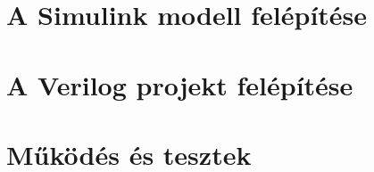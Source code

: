 \documentclass[11pt,a4paper,oneside]{report}             %
\begin{document}
%


\selectthesislanguage



\tableofcontents\vfill







%
%






\chapter{A Simulink modell felépítése}

\chapter{A Verilog projekt felépítése}

\chapter{Működés és tesztek}

%
%
%





\listoffigures{}
\listoftables{}







\end{document}
